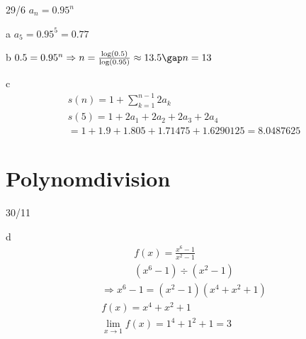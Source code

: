 \begin{exercise}{29/6}
  $a_n = 0.95^n$
  \item [a]
  $a_5 = 0.95^5 = 0.77$
  \item [b]
  $0.5 = 0.95^n \Rightarrow n = \frac{\log(0.5)}{\log(0.95)} \approx 13.5 \gap n = 13$
  \item [c]
  \begin{gather*}
    s(n) = 1 + \sum_{k = 1}^{n - 1} 2a_k \\
    s(5) = 1 + 2a_1 + 2a_2 + 2a_3 + 2a_4 \\ = 1 + 1.9 + 1.805 + 1.71475 + 1.6290125 = 8.0487625
  \end{gather*}
\end{exercise}
\section{Polynomdivision}
\begin{exercise}{30/11}
  \item [d]
  \begin{gather*}
    f(x) = \frac{x^6 - 1}{x^2 - 1} \\
    (x^6 - 1) \div (x^2 - 1)
  \end{gather*}
  \begin{gather*}
    \Rightarrow x^6 - 1 = (x^2 - 1)(x^4 + x^2 + 1) \\
    f(x) = x^4 + x^2 + 1 \\
    \lim\limits_{x \to 1} f(x) = 1^4 + 1^2 + 1 = 3
  \end{gather*}
\end{exercise}
